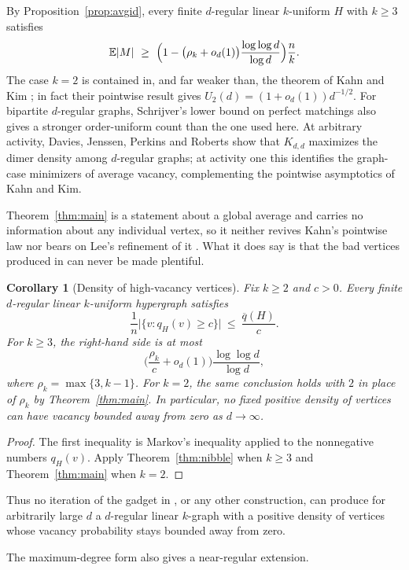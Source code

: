 \documentclass[10pt,a4paper]{amsart}
\newtheorem{corollary}[theorem]{Corollary}
\newcommand{\EX}{\mathbb{E}}
\newcommand{\qbar}{\overline{q}}
\begin{document}
By Proposition~\ref{prop:avgid}, every finite $d$-regular linear $k$-uniform $H$ with
$k\ge3$ satisfies
\[
  \EX|M|\ \ge\ \Bigl(1-\bigl(\rho_k+o_d(1)\bigr)
  \frac{\log\log d}{\log d}\Bigr)\frac{n}{k}.
\]
The case $k=2$ is contained in, and far weaker than, the theorem of Kahn and Kim
\cite{KahnKim98}; in fact their pointwise result gives
$U_2(d)=(1+o_d(1))d^{-1/2}$. For bipartite $d$-regular graphs, Schrijver's lower bound on perfect
matchings \cite{Schrijver} also gives a stronger order-uniform count than the one used
here. At arbitrary activity, Davies, Jenssen, Perkins and Roberts \cite{DJPR} show that
$K_{d,d}$ maximizes the dimer density among $d$-regular graphs; at activity one this
identifies the graph-case minimizers of average vacancy, complementing the pointwise
asymptotics of Kahn and Kim.

Theorem~\ref{thm:main} is a statement about a global average and carries no information
about any individual vertex, so it neither revives Kahn's pointwise law nor bears on Lee's
refinement of it \cite[Conjecture 5.2]{Lee}. What it does say is that the bad vertices
produced in \cite{Lee} can never be made plentiful.

\begin{corollary}[Density of high-vacancy vertices]
\label{cor:nodensity}
Fix $k\ge2$ and $c>0$. Every finite $d$-regular linear $k$-uniform hypergraph satisfies
\[
  \frac1n\bigl|\{v:q_H(v)\ge c\}\bigr|
  \ \le\ \frac{\qbar(H)}c.
\]
For $k\ge3$, the right-hand side is at most
\[
  \biggl(\frac{\rho_k}{c}+o_d(1)\biggr)
       \frac{\log\log d}{\log d},
\]
where $\rho_k=\max\{3,k-1\}$. For $k=2$, the same conclusion holds with $2$ in
place of $\rho_k$ by Theorem~\ref{thm:main}. In particular, no fixed positive density
of vertices can have vacancy bounded away from zero as $d\to\infty$.
\end{corollary}

\begin{proof}
The first inequality is Markov's inequality applied to the nonnegative numbers $q_H(v)$.
Apply Theorem~\ref{thm:nibble} when $k\ge3$ and Theorem~\ref{thm:main} when $k=2$.
\end{proof}

Thus no iteration of the gadget in \cite[\S2]{Lee}, or any other construction, can
produce for arbitrarily large $d$ a $d$-regular linear $k$-graph with a positive density
of vertices whose vacancy probability stays bounded away from zero.

The maximum-degree form also gives a near-regular extension.
\end{document}
